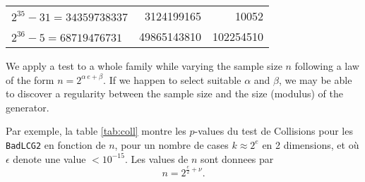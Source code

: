 \begin {table}
\begin {center}
\begin {tabular}{|lrr|}
 $2^{35}-31 = 34359738337$ & 3124199165  & 10052 \\
 $2^{36}-5 = 68719476731$  & 49865143810 & 102254510 \\
\hline
\end {tabular}
\end {center}
\end {table}


We apply a test to a whole family while varying the sample size $n$
following a law of the form $n=2^{\alpha\, e + \beta}$. If we happen to
select suitable $\alpha$ and $\beta$, we may be able to discover a
 regularity between the sample size and the size (modulus) of the
generator.


Par exemple, la table \ref{tab:coll} montre les $p$-values du test
de Collisions pour les
{\tt BadLCG2} en fonction de $n$, pour un nombre de cases $k\approx 2^e$
en 2 dimensions, et o\`u $\epsilon$ denote une value $< 10^{-15}$.
 Les values de $n$ sont donnees par
$$
n = 2^{\frac e 2 + \nu}.
$$


